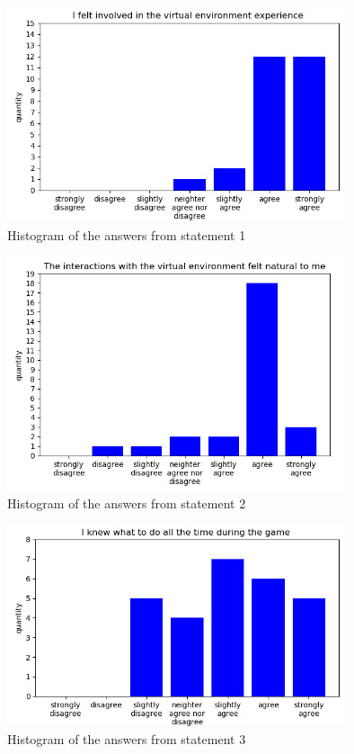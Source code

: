 \begin{figure}[h!]
  \includegraphics[width=10cm]{kapitel/charts/immersion-1.png}
  \centering
  \caption{Histogram of the answers from statement 1}
  \label{fig:chart-immersion-1}
\end{figure}
\newpage
\begin{figure}[h!]
  \includegraphics[width=10cm]{kapitel/charts/immersion-2.png}
  \centering
  \caption{Histogram of the answers from statement 2}
  \label{fig:chart-immersion-2}
\end{figure}
\begin{figure}[h!]
  \includegraphics[width=10cm]{kapitel/charts/guidance-1.png}
  \centering
  \caption{Histogram of the answers from statement 3}
  \label{fig:chart-guidance-1}
\end{figure}
